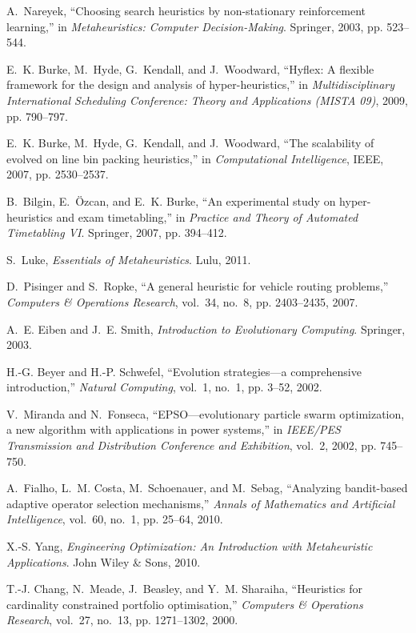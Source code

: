 \documentclass[conference]{IEEEtran}
\begin{document}
\begin{thebibliography}{99}
A.~Nareyek, ``Choosing search heuristics by non-stationary reinforcement learning,'' in \emph{Metaheuristics: Computer Decision-Making}. Springer, 2003, pp. 523--544.

E.~K. Burke, M.~Hyde, G.~Kendall, and J.~Woodward, ``Hyflex: A flexible framework for the design and analysis of hyper-heuristics,'' in \emph{Multidisciplinary International Scheduling Conference: Theory and Applications (MISTA 09)}, 2009, pp. 790--797.

E.~K. Burke, M.~Hyde, G.~Kendall, and J.~Woodward, ``The scalability of evolved on line bin packing heuristics,'' in \emph{Computational Intelligence}, IEEE, 2007, pp. 2530--2537.

B.~Bilgin, E.~Özcan, and E.~K. Burke, ``An experimental study on hyper-heuristics and exam timetabling,'' in \emph{Practice and Theory of Automated Timetabling VI}. Springer, 2007, pp. 394--412.

S.~Luke, \emph{Essentials of Metaheuristics}. Lulu, 2011.

D.~Pisinger and S.~Ropke, ``A general heuristic for vehicle routing problems,'' \emph{Computers \& Operations Research}, vol.~34, no.~8, pp. 2403--2435, 2007.

A.~E. Eiben and J.~E. Smith, \emph{Introduction to Evolutionary Computing}. Springer, 2003.

H.-G. Beyer and H.-P. Schwefel, ``Evolution strategies—a comprehensive introduction,'' \emph{Natural Computing}, vol.~1, no.~1, pp. 3--52, 2002.

V.~Miranda and N.~Fonseca, ``EPSO—evolutionary particle swarm optimization, a new algorithm with applications in power systems,'' in \emph{IEEE/PES Transmission and Distribution Conference and Exhibition}, vol.~2, 2002, pp. 745--750.

A.~Fialho, L.~M. Costa, M.~Schoenauer, and M.~Sebag, ``Analyzing bandit-based adaptive operator selection mechanisms,'' \emph{Annals of Mathematics and Artificial Intelligence}, vol.~60, no.~1, pp. 25--64, 2010.

X.-S. Yang, \emph{Engineering Optimization: An Introduction with Metaheuristic Applications}. John Wiley \& Sons, 2010.

T.-J. Chang, N.~Meade, J.~Beasley, and Y.~M. Sharaiha, ``Heuristics for cardinality constrained portfolio optimisation,'' \emph{Computers \& Operations Research}, vol.~27, no.~13, pp. 1271--1302, 2000.


\end{thebibliography}
\end{document}
